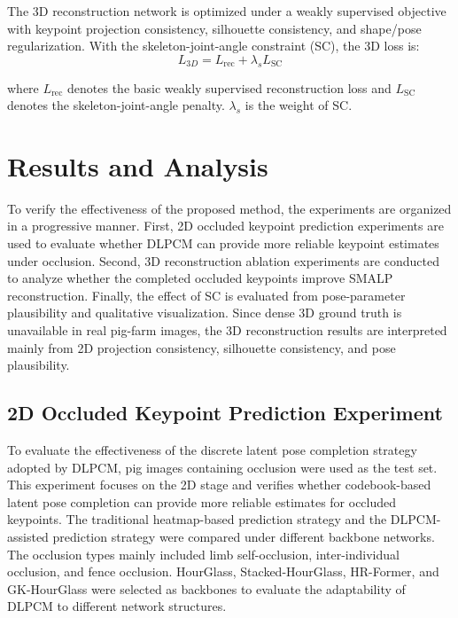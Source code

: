 \documentclass[runningheads]{llncs}
\begin{document}
The 3D reconstruction network is optimized under a weakly supervised objective with keypoint projection consistency, silhouette consistency, and shape/pose regularization. With the skeleton-joint-angle constraint (SC), the 3D loss is:
\begin{equation}
L_{3D} = L_{\text{rec}} + \lambda_s L_{\text{SC}}
\label{eq:3d_loss}
\end{equation}

where $L_{\text{rec}}$ denotes the basic weakly supervised reconstruction loss and $L_{\text{SC}}$ denotes the skeleton-joint-angle penalty. $\lambda_s$ is the weight of SC.

\section{Results and Analysis}
\label{sec:results}

To verify the effectiveness of the proposed method, the experiments are organized in a progressive manner. First, 2D occluded keypoint prediction experiments are used to evaluate whether DLPCM can provide more reliable keypoint estimates under occlusion. Second, 3D reconstruction ablation experiments are conducted to analyze whether the completed occluded keypoints improve SMALP reconstruction. Finally, the effect of SC is evaluated from pose-parameter plausibility and qualitative visualization. Since dense 3D ground truth is unavailable in real pig-farm images, the 3D reconstruction results are interpreted mainly from 2D projection consistency, silhouette consistency, and pose plausibility.

\subsection{2D Occluded Keypoint Prediction Experiment}
\label{subsec:2d_results}

To evaluate the effectiveness of the discrete latent pose completion strategy adopted by DLPCM, pig images containing occlusion were used as the test set. This experiment focuses on the 2D stage and verifies whether codebook-based latent pose completion can provide more reliable estimates for occluded keypoints. The traditional heatmap-based prediction strategy and the DLPCM-assisted prediction strategy were compared under different backbone networks. The occlusion types mainly included limb self-occlusion, inter-individual occlusion, and fence occlusion. HourGlass, Stacked-HourGlass, HR-Former, and GK-HourGlass were selected as backbones to evaluate the adaptability of DLPCM to different network structures.
\end{document}
